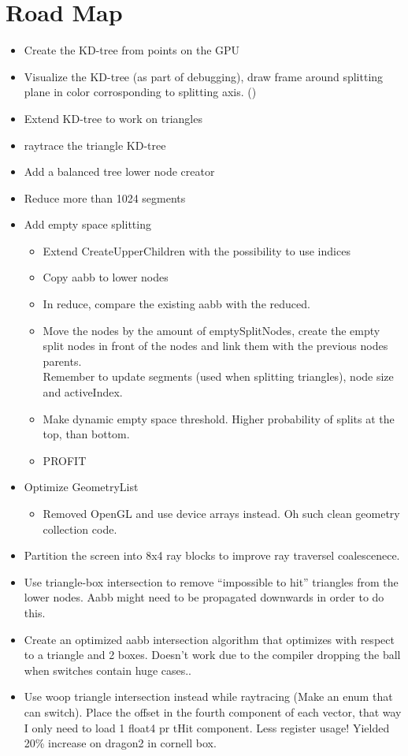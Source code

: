 \section*{Road Map}


\begin{itemize}
\item \color{green}Create the KD-tree from points on the GPU \checkmark
\item Visualize the KD-tree (as part of debugging), draw frame around
  splitting plane in color corrosponding to splitting axis. (\checkmark)
\item Extend KD-tree to work on triangles \checkmark
\item raytrace the triangle KD-tree \checkmark
\item Add a balanced tree lower node creator \checkmark
\item Reduce more than 1024 segments \checkmark
\item Add empty space splitting
  \begin{itemize}
    \item Extend CreateUpperChildren with the possibility to use indices \checkmark
    \item Copy aabb to lower nodes \checkmark
    \item In reduce, compare the existing aabb with the reduced. \checkmark
    \item Move the nodes by the amount of emptySplitNodes, create the
      empty split nodes in front of the nodes and link them with the
      previous nodes parents.\\ Remember to update segments (used when
      splitting triangles), node size and activeIndex. \checkmark
    \item \color{red}Make dynamic empty space threshold. Higher probability of
      splits at the top, than bottom.
    \item PROFIT
  \end{itemize}
\item Optimize GeometryList
  \begin{itemize}
  \item Removed OpenGL and use device arrays instead. Oh such clean
    geometry collection code. \checkmark
  \end{itemize}
\item Partition the screen into 8x4 ray blocks to improve ray
  traversel coalescenece. \checkmark
\item Use triangle-box intersection to remove ``impossible to hit''
  triangles from the lower nodes. Aabb might need to be propagated
  downwards in order to do this.
\item Create an optimized aabb intersection algorithm that
optimizes with respect to a triangle and 2 boxes. Doesn't work due to
the compiler dropping the ball when switches contain huge cases..
\item Use woop triangle intersection instead while raytracing (Make an
  enum that can switch). Place the offset in the fourth component of
  each vector, that way I only need to load 1 float4 pr tHit
  component. Less register usage! Yielded 20\% increase on dragon2 in
  cornell box.


\end{itemize}
